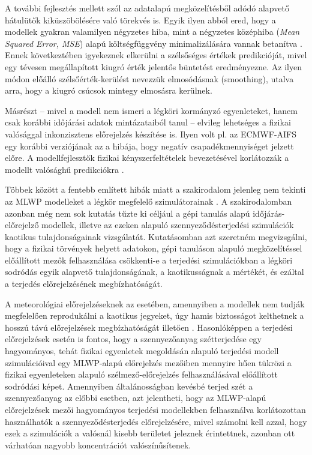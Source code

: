 \documentclass[12pt,a4paper]{article}
\begin{document}
A további fejlesztés mellett szól az adatalapú megközelítésből adódó alapvető hátulütők kiküszöbölésére való törekvés is. Egyik ilyen abból ered, hogy a modellek gyakran valamilyen négyzetes hiba, mint a négyzetes középhiba (\textit{Mean Squared Error, MSE}) alapú költségfüggvény minimalizálására vannak betanítva \cite{bonavita_limitations_2024}. Ennek következtében igyekeznek elkerülni a szélsőséges értékek predikcióját, mivel egy tévesen megállapított kiugró érték jelentős büntetést eredményezne. Az ilyen módon előálló szélsőérték-kerülést nevezzük elmosódásnak (smoothing), utalva arra, hogy a kiugró csúcsok mintegy elmosásra kerülnek. 

Másrészt -- mivel a modell nem ismeri a légköri kormányzó egyenleteket, hanem csak korábbi időjárási adatok mintázataiból tanul -- elvileg lehetséges a fizikai valósággal inkonzisztens előrejelzés készítése is. Ilyen volt pl. az ECMWF-AIFS egy korábbi verziójának az a hibája, hogy negatív csapadékmennyiséget jelzett előre. A modellfejlesztők fizikai kényszerfeltételek bevezetésével korlátozzák a modellt valósághű predikciókra \cite{moldovan_update_2025}. 

Többek között a fentebb említett hibák miatt a szakirodalom jelenleg nem tekinti az MLWP modelleket a légkör megfelelő szimulátorainak \cite{bonavita_limitations_2024}. A szakirodalomban azonban még nem sok kutatás tűzte ki céljául a gépi tanulás alapú időjárás-előrejelző modellek, illetve az ezeken alapuló szennyeződésterjedési szimulációk kaotikus tulajdonságainak vizsgálatát. Kutatásomban azt szeretném megvizsgálni, hogy a fizikai törvények helyett adatokon, gépi tanuláson alapuló megközelítéssel előállított mezők felhasználása csökkenti-e a terjedési szimulációkban a légköri sodródás egyik alapvető tulajdonságának, a kaotikusságnak a mértékét, és ezáltal a terjedés előrejelzésének megbízhatóságát. 

A meteorológiai előrejelzéseknek az esetében, amennyiben a modellek nem tudják megfelelően reprodukálni a kaotikus jegyeket, úgy hamis biztosságot kelthetnek a hosszú távú előrejelzések megbízhatóságát illetően \cite{selz_can_2023}. Hasonlóképpen a terjedési előrejelzések esetén is fontos, hogy a szennyezőanyag szétterjedése egy hagyományos, tehát fizikai egyenletek megoldásán alapuló terjedési modell szimulációival egy MLWP-alapú előrejelzés mezőiben mennyire hűen tükrözi a fizikai egyenleteken alapuló szélmező-előrejelzés felhasználásával előállított sodródási képet. Amennyiben általánosságban kevésbé terjed szét a szennyezőanyag az előbbi esetben, azt jelentheti, hogy az MLWP-alapú előrejelzések mezői hagyományos terjedési modellekben felhasználva korlátozottan használhatók a szennyeződésterjedés előrejelzésére, mivel számolni kell azzal, hogy ezek a szimulációk a valósnál kisebb területet jeleznek érintettnek, azonban ott várhatóan nagyobb koncentrációt valószínűsítenek.
\end{document}
